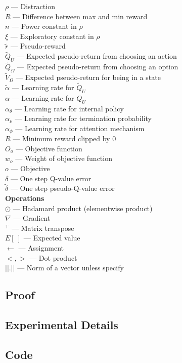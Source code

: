 \documentclass{article}
\begin{document}
	$\rho$ --- Distraction\\
	$R$ --- Difference between max and min reward\\
	$n$ --- Power constant in $\rho$\\
	$\xi$ --- Exploratory constant in $\rho$\\
	$\widetilde{r}$ --- Pseudo-reward\\
	$\widetilde{Q}_U$ --- Expected pseudo-return from choosing an action\\
	$\widetilde{Q}_\Omega$ --- Expected pseudo-return from choosing an option\\
	$\widetilde{V}_\Omega$ --- Expected pseudo-return for being in a state\\
	$\widetilde{\alpha}$ --- Learning rate for $\widetilde{Q}_U$\\
	$\alpha$ --- Learning rate for $Q_U$\\
	$\alpha_\theta$ --- Learning rate for internal policy\\
	$\alpha_\nu$ --- Learning rate for termination probability\\
	$\alpha_\phi$ --- Learning rate for attention mechanism\\
	$R$ --- Minimum reward clipped by 0\\
	$O_o$ --- Objective function\\
	$w_o$ --- Weight of objective function\\
	$o$ --- Objective\\
	$\delta$ --- One step Q-value error\\
	$\widetilde{\delta}$ --- One step pseudo-Q-value error\\
	{\bfseries Operations}\\
	$\odot$ --- Hadamard product (elementwise product)\\
	$\nabla$ --- Gradient\\
	$^\intercal$ --- Matrix transpose\\
	$E[\ ]$ --- Expected value\\
	$\leftarrow$ --- Assignment\\
	$<,>$ --- Dot product\\
	$||.||$ --- Norm of a vector unless specify\\
	\subsection*{Proof}
	\subsection*{Experimental Details}
	\subsection*{Code}
\end{document}
